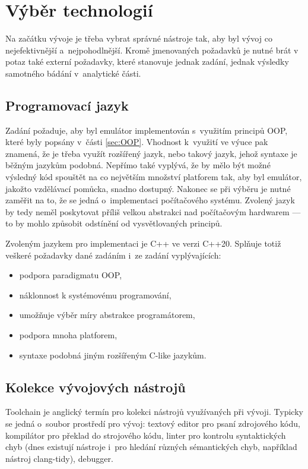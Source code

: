 \section{Výběr technologií}
Na začátku vývoje je třeba vybrat správné nástroje tak, aby byl vývoj co nejefektivnější a~nejpohodlnější. Kromě jmenovaných požadavků je nutné brát v potaz také externí požadavky, které stanovuje jednak zadání, jednak výsledky samotného bádání v~analytické části.

\subsection{Programovací jazyk}
Zadání požaduje, aby byl emulátor implementován s~využitím principů OOP, které byly popsány v~části \ref{sec:OOP}. Vhodnost k~využití ve výuce pak znamená, že je třeba využít rozšířený jazyk, nebo takový jazyk, jehož syntaxe je běžným jazykům podobná. Nepřímo také vyplývá, že by mělo být možné výsledný kód spouštět na co největším množství platforem tak, aby byl emulátor, jakožto vzdělávací pomůcka, snadno dostupný. Nakonec se při výběru je nutné zaměřit na to, že se jedná o~implementaci počítačového systému. Zvolený jazyk by tedy neměl poskytovat příliš velkou abstrakci nad počítačovým hardwarem --- to by mohlo způsobit odstínění od vysvětlovaných principů.

Zvoleným jazykem pro implementaci je C++ ve verzi C++20. Splňuje totiž veškeré požadavky dané zadáním i~ze zadání vyplývajících:
\begin{itemize}
	\item podpora paradigmatu OOP,
	\item náklonnost k systémovému programování,
	\item umožňuje výběr míry abstrakce programátorem,
	\item podpora mnoha platforem,
	\item syntaxe podobná jiným rozšířeným C-like jazykům.
\end{itemize}

\subsection{Kolekce vývojových nástrojů}
\begin{definition}[Toolchain]
	Toolchain je anglický termín pro kolekci nástrojů využívaných při vývoji. Typicky se jedná o~soubor prostředí pro vývoj: textový editor pro psaní zdrojového kódu, kompilátor pro překlad do strojového kódu, linter pro kontrolu syntaktických chyb (dnes existují nástroje i~pro hledání různých sémantických chyb, například nástroj clang-tidy), debugger.
\end{definition}

